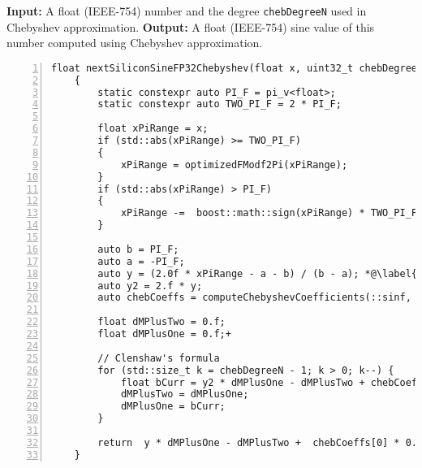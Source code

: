 
\begin{algorithm}
    \caption{Sine using Taylor series: Existing Method}
    \begin{algorithmic}[1]
    \State \textbf{Input:} A float (IEEE-754) number and the degree \texttt{chebDegreeN} used in Chebyshev approximation.
    \State \textbf{Output:} A float (IEEE-754) sine value of this number computed using Chebyshev approximation.
\begin{lstlisting}[numbers=left]
    float nextSiliconSineFP32Chebyshev(float x, uint32_t chebDegreeN)
    {
        static constexpr auto PI_F = pi_v<float>;
        static constexpr auto TWO_PI_F = 2 * PI_F;

        float xPiRange = x;
        if (std::abs(xPiRange) >= TWO_PI_F)
        {
            xPiRange = optimizedFModf2Pi(xPiRange);
        }
        if (std::abs(xPiRange) > PI_F)
        {
            xPiRange -=  boost::math::sign(xPiRange) * TWO_PI_F;
        }

        auto b = PI_F;
        auto a = -PI_F;
        auto y = (2.0f * xPiRange - a - b) / (b - a); *@\label{alg:sine_cheb:ln:scaling}@*
        auto y2 = 2.f * y;
        auto chebCoeffs = computeChebyshevCoefficients(::sinf, chebDegreeN, a, b);

        float dMPlusTwo = 0.f;
        float dMPlusOne = 0.f;+

        // Clenshaw's formula
        for (std::size_t k = chebDegreeN - 1; k > 0; k--) {
            float bCurr = y2 * dMPlusOne - dMPlusTwo + chebCoeffs[k];
            dMPlusTwo = dMPlusOne;
            dMPlusOne = bCurr;
        }

        return  y * dMPlusOne - dMPlusTwo +  chebCoeffs[0] * 0.5;
    }

\end{lstlisting}
\end{algorithmic}
 \label{alg:sine_cheb_opt}
\end{algorithm}